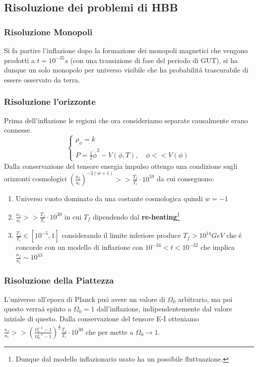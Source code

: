 \documentclass[12pt, a4paper]{article}
\begin{document}
\subsection{Risoluzione dei problemi di HBB}
\subsubsection{Risoluzione Monopoli}
Si fa partire l'inflazione dopo la formazione dei monopoli magnetici che vengono prodotti a $t=10^{-35}s$ (con una transizione di fase del periodo di GUT), si ha dunque un solo monopolo per universo visibile che ha probabilit\'{a} trascurabile di essere osservato da terra.
\subsubsection{Risoluzione l'orizzonte}
Prima dell'inflazione le regioni che ora consideriamo separate causalmente erano connesse.
\begin{equation}
\begin{cases}
\rho_{\phi}=k
\\
P=\frac{1}{2}\dot{\phi}^2-V(\phi,T), \quad \phi<< V(\phi)
\end{cases}
\end{equation}
Dalla conservazione del tensore energia impulso ottengo una condizione sugli orizzonti cosmologici $(\frac{a_f}{a_i})^{-3(w+1)}>>\frac{T_f}{T_i}\cdot 10^{59}$ da cui conseguono:
\begin{enumerate}
\item Universo vuoto dominato da una costante cosmologica quindi $w=-1$
\item  $\frac{a_f}{a_i}>>\frac{T_f}{T_i}\cdot 10^{30}$ in cui $T_f$ dipendendo dal \textbf{re-heating}\footnote{Dunque dal modello inflazionario usato ha un possibile fluttuazione.}
\item $\frac{T_f}{T_i}\in [10^{-5}, 1]$ considerando il limite inferiore produce $T_f > 10^{14} GeV$ che \'{e} concorde con un modello di inflazione con $10^{-34}<t<10^{-32}$ che implica $\frac{a_f}{a_i}\sim 10^{43}$
\end{enumerate}
\subsubsection{Risoluzione della Piattezza}
L'universo all'epoca di Planck pu\'{o} avere un valore di $\Omega_0$ arbitrario, ma poi questo verra\'{a} spinto a $\Omega_0=1$ dall'inflazione, indipendentemente dal valore iniziale di questo. Dalla conservazione del tensore E-I otteniamo $\frac{a_f}{a_i}>>(\frac{\Omega_i^{-1}-1}{\Omega_0^{-1}-1})^{\frac{1}{2}}\frac{T_f}{T_i}\cdot 10^{30}$  che per mette a $\Omega_0 \rightarrow 1$.
\end{document}
